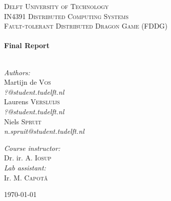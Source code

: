 \begin{titlepage}

\begin{center}


\textsc{\Large Delft University of Technology }\\[1.5cm]

\textsc{\large IN4391 Distributed Computing Systems}\\[0.5cm]
\textsc{\normalsize Fault-tolerant Distributed Dragon Game (FDDG)}\\[0.5cm]


\HRule \\[0.4cm]
{ \huge \bfseries Final Report}\\[0.4cm]

\HRule \\[1.5cm]

\begin{minipage}{0.4\textwidth}
\begin{flushleft} \large
\emph{Authors:}\\
Martijn de \textsc{Vos} \\ [0.1cm]
\emph{?@student.tudelft.nl} \\ [0.1cm]
Laurens \textsc{Versluijs} \\ [0.1cm]
\emph{?@student.tudelft.nl} \\ [0.1cm]
Niels \textsc{Spruit} \\ [0.1cm]
\emph{n.spruit@student.tudelft.nl} \\ [0.1cm]
\end{flushleft}
\end{minipage}
\begin{minipage}{0.4\textwidth}
\begin{flushright} \large
\emph{Course instructor:} \\
Dr. ir. A. \textsc{Iosup}\\
\emph{Lab assistant:} \\
Ir. M. \textsc{Capot\v{a}} 
\end{flushright}
\end{minipage}
\vspace{30mm}

\vfill

{\large \today}

\end{center}

\end{titlepage}